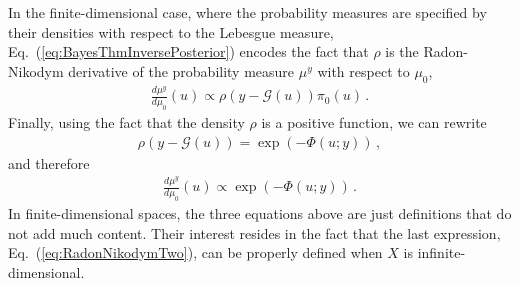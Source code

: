 In the finite-dimensional case, where the probability measures are
specified by their densities with respect to the Lebesgue measure,
Eq.~(\ref{eq:BayesThmInversePosterior}) encodes the fact that $\rho$
is the Radon-Nikodym derivative of the probability measure $\mu^y$
with respect to $\mu_0$, \viz
\begin{align}
  \label{eq:RadonNikodym}
  \frac{d\mu^y}{d\mu_0} (u) \propto \rho(y-\mathcal G(u)) \pi_0(u)\, .
\end{align}
Finally, using the fact that the density $\rho$ is a positive
function, we can rewrite 
\begin{align}
  \label{eq:PotentialDef}
  \rho(y-\mathcal G(u)) = \exp\left(-\Phi(u;y)\right)\, ,
\end{align}
and therefore
\begin{align}
  \label{eq:RadonNikodymTwo}
  \frac{d\mu^y}{d\mu_0} (u) \propto \exp\left(-\Phi(u;y)\right)\, .
\end{align}
In finite-dimensional spaces, the three equations above are just
definitions that do not add much content. Their interest resides in
the fact that the last expression, Eq.~(\ref{eq:RadonNikodymTwo}), can
be properly defined when $X$ is infinite-dimensional.


